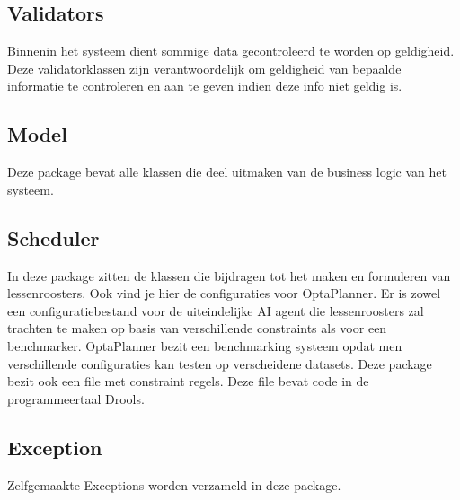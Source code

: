 \subsection{Validators}
\label{subsec:validators}
Binnenin het systeem dient sommige data gecontroleerd te worden op geldigheid. 
Deze validatorklassen zijn verantwoordelijk om geldigheid van bepaalde informatie te controleren en aan te geven indien deze info niet geldig is. 

\subsection{Model}
\label{subsec:model}
Deze package bevat alle klassen die deel uitmaken van de business logic van het systeem.

\subsection{Scheduler}
\label{subsec:scheduler}
In deze package zitten de klassen die bijdragen tot het maken en formuleren van lessenroosters.
Ook vind je hier de configuraties voor OptaPlanner.
Er is zowel een configuratiebestand voor de uiteindelijke AI agent die lessenroosters zal trachten te maken op basis van verschillende constraints als voor een benchmarker.
OptaPlanner bezit een benchmarking systeem opdat men verschillende configuraties kan testen op verscheidene datasets.
Deze package bezit ook een file met constraint regels.
Deze file bevat code in de programmeertaal Drools\cite{Drools}.

\subsection{Exception}
\label{subsec:exception}
Zelfgemaakte Exceptions worden verzameld in deze package.
